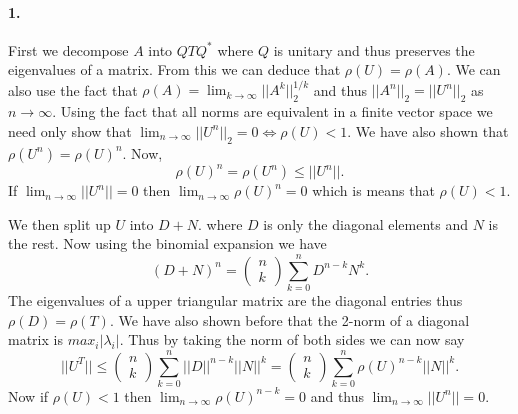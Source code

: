\documentclass[12pt]{article}
\begin{document}
\paragraph{1.}
	First we decompose $A$ into $QTQ^*$ where $Q$ is unitary and thus preserves the eigenvalues of a matrix. From this we can deduce that $\rho(U) = \rho(A)$. We can also use the fact that $\rho(A) = \lim_{k\rightarrow \infty} ||A^k||_2^{1/k}$ and thus $||A^n||_2 = ||U^n||_2$ as $n\rightarrow \infty$. Using the fact that all norms are equivalent in a finite vector space we need only show that $\lim_{n\rightarrow \infty}||U^n||_2 = 0 \Leftrightarrow \rho(U) < 1$. We have also shown that $\rho(U^n) = \rho(U)^n$.
	Now, 
	\[
	\rho(U)^n = \rho(U^n) \le ||U^n||.
	\]
	If $\lim_{n\rightarrow \infty}||U^n|| = 0$ then $\lim_{n\rightarrow \infty}\rho(U)^n = 0$ which is means that $\rho(U) < 1$.
	
	We then split up $U$ into $D + N$. where $D$ is only the diagonal elements and $N$ is the rest. Now using the binomial expansion we have 
	\[
	(D + N)^n = \left(\begin{matrix} n \\ k \end{matrix}\right) \sum_{k=0}^{n}D^{n-k}N^k.
	\]
	The eigenvalues of a upper triangular matrix are the diagonal entries thus $\rho(D) = \rho(T)$. We have also shown before that the 2-norm of a diagonal matrix is $max_i|\lambda_i|$. Thus by taking the norm of both sides we can now say 
	\[
	||U^T|| \le \left(\begin{matrix} n \\ k \end{matrix}\right) \sum_{k=0}^{n}||D||^{n-k}||N||^k
	 = \left(\begin{matrix} n \\ k \end{matrix}\right) \sum_{k=0}^{n}\rho(U)^{n-k}||N||^k.
	\]
	Now if $\rho(U) < 1$ then $\lim_{n\rightarrow \infty} \rho(U)^{n-k} = 0$ and thus $\lim_{n\rightarrow \infty}||U^n|| = 0$.
\end{document}
